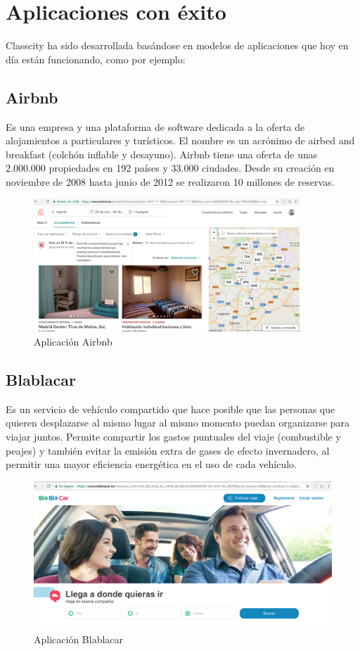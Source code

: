 \section{Aplicaciones con éxito}


Classcity ha sido desarrollada basándose en modelos de aplicaciones que hoy en día están funcionando, como por ejemplo:

\subsection{Airbnb}

Es una empresa y una plataforma de software dedicada a la oferta de alojamientos a particulares y turísticos. El nombre es un acrónimo de airbed and breakfast (colchón inflable y desayuno). Airbnb tiene una oferta de unas 2.000.000 propiedades en 192 países y 33.000 ciudades. Desde su creación en noviembre de 2008 hasta junio de 2012 se realizaron 10 millones de reservas.

\begin{figure}[H]
    \centering
    \includegraphics[width=100mm]{memoria/LaTeX/img/introduccion/airbnb.png}
    \caption{Aplicación Airbnb}
\end{figure}

\subsection{Blablacar}

Es un servicio de vehículo compartido que hace posible que las personas que quieren desplazarse al mismo lugar al mismo momento puedan organizarse para viajar juntos. Permite compartir los gastos puntuales del viaje (combustible y peajes) y también evitar la emisión extra de gases de efecto invernadero, al permitir una mayor eficiencia energética en el uso de cada vehículo.

\begin{figure}[H]
    \centering
    \includegraphics[width=120mm]{memoria/LaTeX/img/introduccion/blablacar.png}
    \caption{Aplicación Blablacar}
\end{figure}

